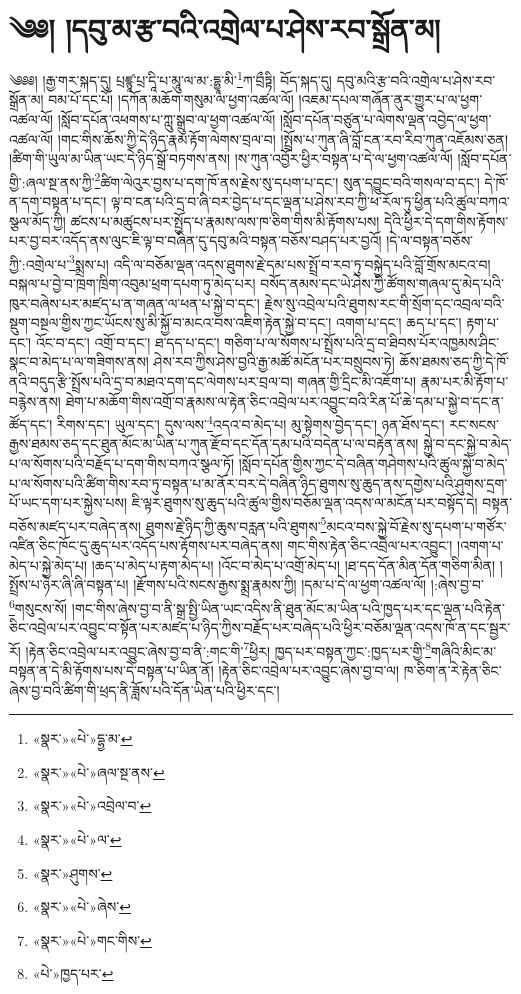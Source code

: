 \chapter{༄༅། །དབུ་མ་རྩ་བའི་འགྲེལ་པ་ཤེས་རབ་སྒྲོན་མ།}༄༅༅། །རྒྱ་གར་སྐད་དུ། པྲཛྙཱ་པྲ་དཱི་པ་མཱུ་ལ་མ་:དྷྱཱ་མི་\footnote{«སྣར་»«པེ་»དྷྱ་མ་}ཀ་བྲྀཏྟི། བོད་སྐད་དུ། དབུ་མའི་རྩ་བའི་འགྲེལ་པ་ཤེས་རབ་སྒྲོན་མ། བམ་པོ་དང་པོ། །དཀོན་མཆོག་གསུམ་ལ་ཕྱག་འཚལ་ལོ། །འཇམ་དཔལ་གཞོན་ནུར་གྱུར་པ་ལ་ཕྱག་འཚལ་ལོ། །སློབ་དཔོན་འཕགས་པ་ཀླུ་སྒྲུབ་ལ་ཕྱག་འཚལ་ལོ། །སློབ་དཔོན་བཙུན་པ་ལེགས་ལྡན་འབྱེད་ལ་ཕྱག་འཚལ་ལོ། །གང་གིས་ཆོས་ཀྱི་དེ་ཉིད་རྣམ་རྟོག་ལེགས་བྲལ་བ། །སྤྲོས་པ་ཀུན་ཞི་བློ་ངན་རབ་རིབ་ཀུན་འཇོམས་ཅན། །ཚིག་གི་ཡུལ་མ་ཡིན་ཡང་དེ་ཉིད་སྒྲོ་བཏགས་ནས། །ས་ཀུན་འབྱོར་ཕྱིར་བསྟན་པ་དེ་ལ་ཕྱག་འཚལ་ལོ། །སློབ་དཔོན་གྱི་:ཞལ་སྔ་ནས་ཀྱི་\footnote{«སྣར་»«པེ་»ཞལ་སྔ་ནས་}ཚིག་ལེའུར་བྱས་པ་དག་ཁོ་ནས་རྗེས་སུ་དཔག་པ་དང་། སུན་དབྱུང་བའི་གསལ་བ་དང་། དེ་ཁོ་ན་དག་བསྟན་པ་དང་། ལྟ་བ་ངན་པའི་དྲ་བ་ཞི་བར་བྱེད་པ་དང་ལྡན་པ་ཤེས་རབ་ཀྱི་ཕ་རོལ་ཏུ་ཕྱིན་པའི་ཚུལ་བཀའ་སྩལ་མོད་ཀྱི། ཚངས་པ་མཚུངས་པར་སྤྱོད་པ་རྣམས་ལས་ཁ་ཅིག་གིས་མི་རྟོགས་པས། དེའི་ཕྱིར་དེ་དག་གིས་རྟོགས་པར་བྱ་བར་འདོད་ནས་ལུང་ཇི་ལྟ་བ་བཞིན་དུ་དབུ་མའི་བསྟན་བཅོས་བཤད་པར་བྱའོ། །དེ་ལ་བསྟན་བཅོས་ཀྱི་:འགྲེལ་པ་\footnote{«སྣར་»«པེ་»འབྲེལ་བ་}སྨྲས་པ། འདི་ལ་བཅོམ་ལྡན་འདས་ཐུགས་རྗེ་དམ་པས་སྤྲོ་བ་རབ་ཏུ་བསྐྱེད་པའི་བློ་གྲོས་མངའ་བ། བསྐལ་པ་བྱེ་བ་ཁྲག་ཁྲིག་འབུམ་ཕྲག་དཔག་ཏུ་མེད་པར། བསོད་ནམས་དང་ཡེ་ཤེས་ཀྱི་ཚོགས་གཞལ་དུ་མེད་པའི་ཁུར་བཞེས་པར་མཛད་པ་ན་གཞན་ལ་ཕན་པ་སྐྱེ་བ་དང་། རྗེས་སུ་འབྲེལ་པའི་ཐུགས་རང་གི་སྲོག་དང་འབྲལ་བའི་སྡུག་བསྔལ་གྱིས་ཀྱང་ཡོངས་སུ་མི་སྐྱོ་བ་མངའ་བས་འཇིག་རྟེན་སྐྱེ་བ་དང་། འགག་པ་དང་། ཆད་པ་དང་། རྟག་པ་དང་། འོང་བ་དང་། འགྲོ་བ་དང་། ཐ་དད་པ་དང་། གཅིག་པ་ལ་སོགས་པ་སྤྲོས་པའི་དྲ་བ་ཐིབས་པོར་འཁྱམས་ཤིང་སྣང་བ་མེད་པ་ལ་གཟིགས་ནས། ཤེས་རབ་ཀྱིས་ཤེས་བྱའི་རྒྱ་མཚོ་མངོན་པར་བསྲུབས་ཏེ། ཆོས་ཐམས་ཅད་ཀྱི་དེ་ཁོ་ནའི་བདུད་རྩི་སྤྲོས་པའི་དྲ་བ་མཐའ་དག་དང་ལེགས་པར་བྲལ་བ། གཞན་གྱི་དྲིང་མི་འཇོག་པ། རྣམ་པར་མི་རྟོག་པ་བརྙེས་ནས། ཐེག་པ་མཆོག་གིས་འགྲོ་བ་རྣམས་ལ་རྟེན་ཅིང་འབྲེལ་པར་འབྱུང་བའི་རིན་པོ་ཆེ་དམ་པ་སྐྱེ་བ་དང་ན་ཚོད་དང་། རིགས་དང་། ཡུལ་དང་། དུས་ལས་\footnote{«སྣར་»«པེ་»ལ་}འདའ་བ་མེད་པ། མུ་སྟེགས་བྱེད་དང་། ཉན་ཐོས་དང་། རང་སངས་རྒྱས་ཐམས་ཅད་དང་ཐུན་མོང་མ་ཡིན་པ་ཀུན་རྫོབ་དང་དོན་དམ་པའི་བདེན་པ་ལ་བརྟེན་ནས། སྐྱེ་བ་དང་སྐྱེ་བ་མེད་པ་ལ་སོགས་པའི་བརྗོད་པ་དག་གིས་བཀའ་སྩལ་ཏོ། །སློབ་དཔོན་གྱིས་ཀྱང་དེ་བཞིན་གཤེགས་པའི་ཚུལ་སྐྱེ་བ་མེད་པ་ལ་སོགས་པའི་ཚིག་གིས་རབ་ཏུ་བསྟན་པ་མ་ནོར་བར་དེ་བཞིན་ཉིད་ཐུགས་སུ་ཆུད་ནས་དགྱེས་པའི་ཤུགས་དྲག་པོ་ཡང་དག་པར་སྐྱེས་པས། ཇི་ལྟར་ཐུགས་སུ་ཆུད་པའི་ཚུལ་གྱིས་བཅོམ་ལྡན་འདས་ལ་མངོན་པར་བསྟོད་དེ། བསྟན་བཅོས་མཛད་པར་བཞེད་ནས། ཐུགས་རྗེ་ཉིད་ཀྱི་ཆུས་བརླན་པའི་ཐུགས་\footnote{«སྣར་»ཤུགས་}མངའ་བས་སྐྱེ་བོ་རྗེས་སུ་དཔག་པ་གཙོར་འཛིན་ཅིང་ཁོང་དུ་ཆུད་པར་འདོད་པས་རྟོགས་པར་བཞེད་ནས། གང་གིས་རྟེན་ཅིང་འབྲེལ་པར་འབྱུང་། །འགག་པ་མེད་པ་སྐྱེ་མེད་པ། །ཆད་པ་མེད་པ་རྟག་མེད་པ། །འོང་བ་མེད་པ་འགྲོ་མེད་པ། །ཐ་དད་དོན་མིན་དོན་གཅིག་མིན། །སྤྲོས་པ་ཉེར་ཞི་ཞི་བསྟན་པ། །རྫོགས་པའི་སངས་རྒྱས་སྨྲ་རྣམས་ཀྱི། །དམ་པ་དེ་ལ་ཕྱག་འཚལ་ལོ། །:ཞེས་བྱ་བ་\footnote{«སྣར་»«པེ་»ཞེས་}གསུངས་སོ། །གང་གིས་ཞེས་བྱ་བ་ནི་སྒྲ་སྤྱི་ཡིན་ཡང་འདིས་ནི་ཐུན་མོང་མ་ཡིན་པའི་ཁྱད་པར་དང་ལྡན་པའི་རྟེན་ཅིང་འབྲེལ་པར་འབྱུང་བ་སྟོན་པར་མཛད་པ་ཉིད་ཀྱིས་བརྗོད་པར་བཞེད་པའི་ཕྱིར་བཅོམ་ལྡན་འདས་ཁོ་ན་དང་སྦྱར་རོ། །རྟེན་ཅིང་འབྲེལ་པར་འབྱུང་ཞེས་བྱ་བ་ནི་:གང་གི་\footnote{«སྣར་»«པེ་»གང་གིས་}ཕྱིར། ཁྱད་པར་བསྟན་ཀྱང་:ཁྱད་པར་གྱི་\footnote{«པེ་»ཁྱད་པར་}གཞིའི་མིང་མ་བསྟན་ན་དེ་མི་རྟོགས་པས་དེ་བསྟན་པ་ཡིན་ནོ། །རྟེན་ཅིང་འབྲེལ་པར་འབྱུང་ཞེས་བྱ་བ་ལ། ཁ་ཅིག་ན་རེ་རྟེན་ཅིང་ཞེས་བྱ་བའི་ཚིག་གི་ཕྲད་ནི་ཟློས་པའི་དོན་ཡིན་པའི་ཕྱིར་དང་། 
